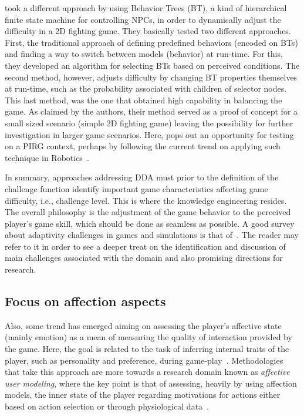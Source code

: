 \cite{sejrsgaard-jacobsen_dynamic_2011} took a different approach by using Behavior Trees (BT), a kind of hierarchical finite state machine for controlling NPCs, in order to dynamically adjust the difficulty in a 2D fighting game. They basically tested two different approaches. First, the traditional approach of defining predefined behaviors (encoded on BTs) and finding a way to switch between models (behavior) at run-time. For this, they developed an algorithm for selecting BTs based on perceived conditions. The second method, however, adjusts difficulty by changing BT properties themselves at run-time, such as the probability associated with children of selector nodes. This last method, was the one that obtained high capability in balancing the game. As claimed by the authors, their method served as a proof of concept for a small sized scenario (simple 2D fighting game) leaving the possibility for further investigation in larger game scenarios. Here, pops out an opportunity for testing on a PIRG context, perhaps by following the current trend on applying such technique in Robotics~\cite{scheper_behavior_2015, pereira_framework_2015, marzinotto_towards_2014}.

In summary, approaches addressing DDA must prior to the definition of the challenge function identify important game characteristics affecting game difficulty, i.e., challenge level. This is where the knowledge engineering resides. The overall philosophy is the adjustment of the game behavior to the perceived player's game skill, which should be done as seamless as possible. A good survey about adaptivity challenges in games and simulations is that of~\cite{lopes_adaptivity_2011}. The reader may refer to it in order to see a deeper treat on the identification and discussion of main challenges associated with the domain and also promising directions for research.

\subsection{Focus on affection aspects}\label{affectmodeling}
Also, some trend has emerged aiming on assessing the player's affective state (mainly emotion) as a mean of measuring the quality of interaction provided by the game. Here, the goal is related to the task of inferring internal traits of the player, such as personality and preference, during game-play~\cite{van_lankveld_psychologically_2009}. Methodologies that take this approach are more towards a research domain known as \textit{affective user modeling}, where the key point is that of assessing, heavily by using affection models, the inner state of the player regarding motivations for actions either based on action selection or through physiological data~\cite{van_lankveld_psychologically_2009}.

